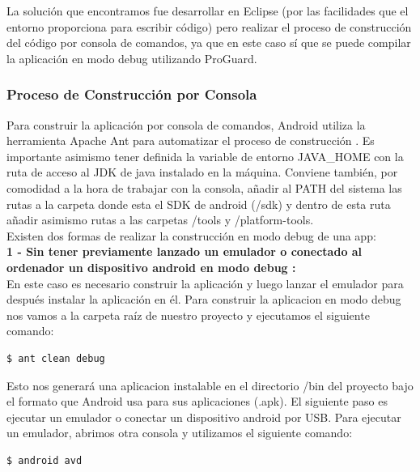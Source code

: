	La solución que encontramos fue desarrollar en Eclipse (por las facilidades que el entorno proporciona para escribir código) pero realizar el proceso de construcción del código por consola de comandos, ya que en este caso sí que se puede compilar la aplicación en modo debug utilizando ProGuard.

	     
    		\subsubsection{Proceso de Construcción por Consola}

		Para construir la aplicación por consola de comandos, Android utiliza la herramienta Apache Ant \cite{ref:ant} para automatizar el proceso de construcción \cite{ref:android_cmd_line}. Es importante asimismo tener definida la variable de entorno JAVA\_HOME con la ruta de acceso al JDK de java instalado en la máquina. Conviene también, por comodidad a la hora de trabajar con la consola, añadir al PATH del sistema las rutas a la carpeta donde esta el SDK de android (/sdk) y dentro de esta ruta añadir asimismo rutas a las carpetas /tools y /platform-tools. \\[.2cm]

Existen dos formas de realizar la construcción en modo debug de una app: \\[.2cm] 

\textbf{1 - Sin tener previamente lanzado un emulador o conectado al ordenador un dispositivo android en modo debug \cite{ref:android_device_setUp}:} \\[.2cm]
 
 	 En este caso es necesario construir la aplicación y luego lanzar el emulador para después instalar la aplicación en él. Para construir la aplicacion en modo debug nos vamos a la carpeta raíz de nuestro proyecto y ejecutamos el siguiente comando: 

 	 \begin{lstlisting}[style=console, numbers=none]
		$ ant clean debug
	 \end{lstlisting}
 	 
 	 Esto nos generará una aplicacion instalable en el directorio /bin del proyecto bajo el formato que Android usa para sus aplicaciones (.apk). El siguiente paso es ejecutar un emulador o conectar un dispositivo android por USB. Para ejecutar un emulador, abrimos otra consola y utilizamos el siguiente comando:
 	 
 	 \begin{lstlisting}[style=console, numbers=none]
		$ android avd
	 \end{lstlisting}
 	 

